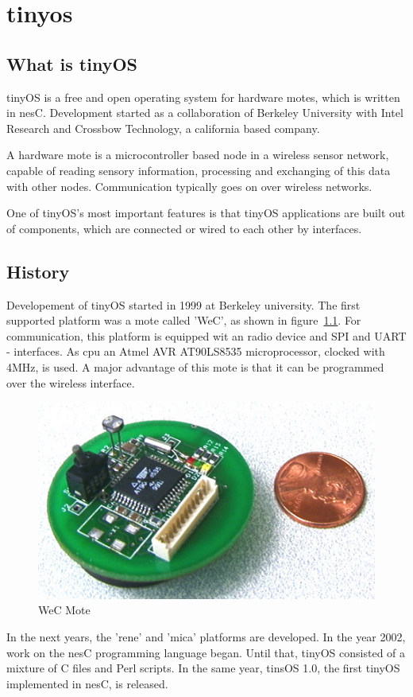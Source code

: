 
\chapter{tinyos} \label{chapter:tinyos}

\section{What is tinyOS}

tinyOS is a free and open operating system for hardware motes, which is written in nesC. Development started as a collaboration of Berkeley University with Intel Research and Crossbow Technology, a california based company.

A hardware mote is a microcontroller based node in a wireless sensor network, capable of reading sensory information, processing and exchanging of this data with other nodes. Communication typically goes on over wireless networks.

One of tinyOS's most important features is that tinyOS applications are built out of components, which are connected or wired to each other by interfaces. 

\section{History}

Developement of tinyOS started in 1999 at Berkeley university. The first supported platform was a mote 
called 'WeC', as shown in figure~\ref{fig:WeC}. For communication, this platform is equipped wit an radio device and SPI and UART - interfaces. As cpu an Atmel AVR AT90LS8535 microprocessor, clocked with 4MHz, is used. A major advantage of this mote is that it can be programmed over the wireless interface.
\begin{figure}[h]
 \centerline{\includegraphics[width=.5\columnwidth]{pics/WeC.png}}
  \caption{WeC Mote}
  \label{fig:WeC}
\end{figure}

In the next years, the 'rene' and 'mica' platforms are developed. In the year 2002, work on the nesC programming language began. Until that, tinyOS consisted of a mixture of C files and Perl scripts. In the same year, tinsOS 1.0, the first tinyOS implemented in nesC, is released. 

